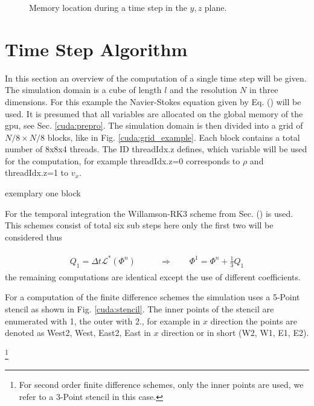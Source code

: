 \begin{figure}[!bp]
      \centering
       \caption{
           Memory location during a time step in the $y, z$ plane.
           }
       \label{cuda:timestep_algo_img}
\end{figure}

\clearpage
\section{Time Step Algorithm}

In this section an overview of the computation of a single time step will be given.
The simulation domain is a cube of length $l$ and the resolution $N$ in three dimensions.
For this example the Navier-Stokes equation given by Eq. () will be used.
It is presumed that all variables are allocated on the global memory of the gpu, see Sec. \ref{cuda:prepro}.
The simulation domain is then divided into a grid of  $N/8 \times N/8$ blocks, like in Fig. \ref{cuda:grid_example}.
Each block contains a total number of 8x8x4 threads.
The ID threadIdx.z defines, which variable will be used for the computation, for example threadIdx.z=0 corresponds to $\rho$ and threadIdx.z=1 to $v_x$.

exemplary one block

For the temporal integration the Willamson-RK3 scheme from Sec. () is used.
This schemes consist of total  six sub steps here only the first two will be considered thus

\begin{align}
    \begin{split}
    Q_1 = \Delta t \mathcal{L}^*\left(\Phi^n\right)\qquad &\Rightarrow \qquad \Phi^{1} = \Phi^n + \frac{1}{3}Q_1
    \end{split}
\end{align}
the remaining computations are identical except the use of different coefficients.

For a computation of the finite difference schemes the simulation uses a 5-Point stencil as shown in Fig. \ref{cuda:stencil}.
The inner points of the stencil are enumerated with 1, the outer with 2., for example in $x$ direction the points are denoted as West2,
West, East2, East in $x$ direction or in short (W2, W1, E1, E2).

\footnote{For second order finite difference schemes, only the inner points are used, we refer to a 3-Point stencil in this case.}



